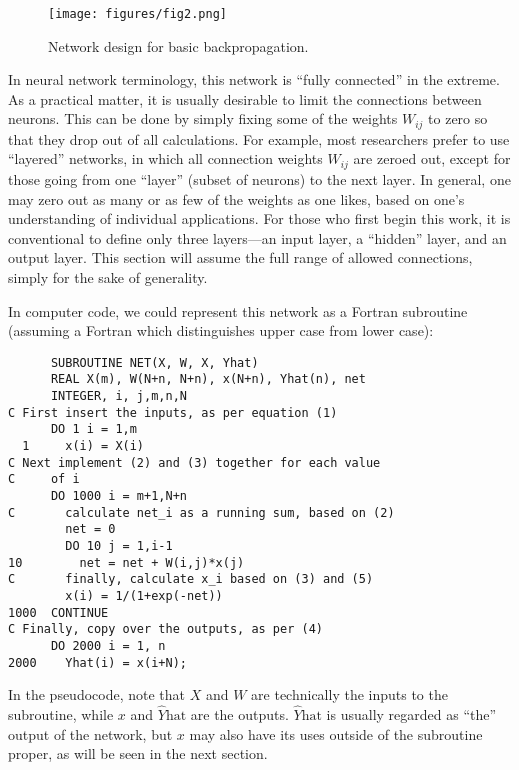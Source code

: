 \documentclass[journal]{IEEEtran} %
\begin{document}
\begin{figure}[htb]
    \centering
    \texttt{[image: figures/fig2.png]} %
    \caption{Network design for basic backpropagation.}
    \label{fig:network_design}
\end{figure}

In neural network terminology, this network is ``fully connected'' in the extreme. As a practical matter, it is usually desirable to limit the connections between neurons. This can be done by simply fixing some of the weights $W_{ij}$ to zero so that they drop out of all calculations. For example, most researchers prefer to use ``layered'' networks, in which all connection weights $W_{ij}$ are zeroed out, except for those going from one ``layer'' (subset of neurons) to the next layer. In general, one may zero out as many or as few of the weights as one likes, based on one's understanding of individual applications. For those who first begin this work, it is conventional to define only three layers---an input layer, a ``hidden'' layer, and an output layer. This section will assume the full range of allowed connections, simply for the sake of generality.

In computer code, we could represent this network as a Fortran subroutine (assuming a Fortran which distinguishes upper case from lower case):

\begin{fortrancode}
\caption{SUBROUTINE NET}
\begin{verbatim}
      SUBROUTINE NET(X, W, X, Yhat)
      REAL X(m), W(N+n, N+n), x(N+n), Yhat(n), net
      INTEGER, i, j,m,n,N
C First insert the inputs, as per equation (1)
      DO 1 i = 1,m
  1     x(i) = X(i)
C Next implement (2) and (3) together for each value
C     of i
      DO 1000 i = m+1,N+n
C       calculate net_i as a running sum, based on (2)
        net = 0
        DO 10 j = 1,i-1
10        net = net + W(i,j)*x(j)
C       finally, calculate x_i based on (3) and (5)
        x(i) = 1/(1+exp(-net))
1000  CONTINUE
C Finally, copy over the outputs, as per (4)
      DO 2000 i = 1, n
2000    Yhat(i) = x(i+N);
\end{verbatim}
\end{fortrancode}

In the pseudocode, note that $X$ and $W$ are technically the inputs to the subroutine, while $x$ and $\hat{Y}\text{hat}$ are the outputs. $\hat{Y}\text{hat}$ is usually regarded as ``the'' output of the network, but $x$ may also have its uses outside of the subroutine proper, as will be seen in the next section.
\end{document}
